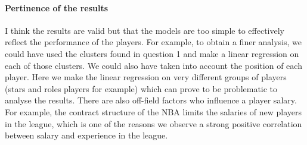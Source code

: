 \paragraph{Pertinence of the results}I think the results are valid but that the models are too simple to effectively reflect the performance of the players. For example, to obtain a finer analysis, we could have used the clusters found in question 1 and make a linear regression on each of those clusters. We could also have taken into account the position of each player.
Here we make the linear regression on very different groups of players (stars and roles players for example) which can prove to be problematic to analyse the results.
There are also off-field factors who influence a player salary. For example, the contract structure of the NBA limits the salaries of new players in the league, which is one of the reasons we observe a strong positive correlation between salary and experience in the league.